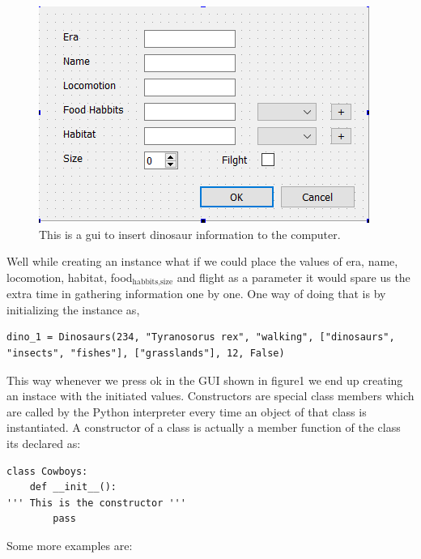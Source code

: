 \documentclass[11pt]{article}
\begin{document}
\begin{figure}[htbp]
\centering
\includegraphics[width=.9\linewidth]{./img/dino_gui.png}
\caption{\label{fig:org8d9c2a3}
This is a gui to insert dinosaur information to the computer.}
\end{figure}

Well while creating an instance what if we could place the values of era, name, locomotion, habitat, food\(_{\text{habbits,size}}\) and flight as a parameter it would spare us the extra time in gathering information one by one. One way of doing that is by initializing the instance as,

\begin{verbatim}
dino_1 = Dinosaurs(234, "Tyranosorus rex", "walking", ["dinosaurs", "insects", "fishes"], ["grasslands"], 12, False)
\end{verbatim}

This way whenever we press ok in the GUI shown in figure1 we end up creating an instace with the initiated values. Constructors are special class members which are called by the Python interpreter every time an object of that class is instantiated. A constructor of a class is actually a member function of the class its declared as:
\begin{verbatim}
class Cowboys:
    def __init__():
''' This is the constructor '''
        pass
\end{verbatim}

Some more examples are:
\end{document}
